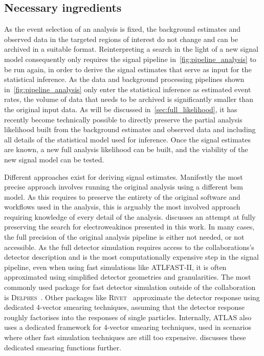 \subsection{Necessary ingredients}

As the event selection of an analysis is fixed, the background estimates and observed data in the targeted regions of interest do not change and can be archived in a suitable format. Reinterpreting a search in the light of a new signal model consequently only requires the signal pipeline in~\cref{fig:pipeline_analysis} to be run again, in order to derive the signal estimates that serve as input for the statistical inference. As the data and background processing pipelines shown in~\cref{fig:pipeline_analysis} only enter the statistical inference as estimated event rates, the volume of data that needs to be archived is significantly smaller than the original input data. As will be discussed in~\cref{sec:full_likelihood}, it has recently become technically possible to directly preserve the partial analysis likelihood built from the background estimates and observed data and including all details of the statistical model used for inference. Once the signal estimates are known, a new full analysis likelihood can be built, and the viability of the new signal model can be tested. 

Different approaches exist for deriving signal estimates. Manifestly the most precise approach involves running the original analysis using a different \gls{bsm} model. As this requires to preserve the entirety of the original software and workflows used in the analysis, this is arguably the most involved approach requiring knowledge of every detail of the analysis.  discusses an attempt at fully preserving the search for electroweakinos presented in this work. In many cases, the full precision of the original analysis pipeline is either not needed, or not accessible. 
As the full detector simulation requires access to the collaborations's detector description and is the most computationally expensive step in the signal pipeline, even when using fast simulations like \textsc{ATLFAST-II}, it is often approximated using simplified detector geometries and granularities. The most commonly used package for fast detector simulation outside of the collaboration is \textsc{Delphes}~\cite{Delphes:2009tx}. Other packages like \eg \textsc{Rivet}~\cite{Rivet1:2010ar,Rivet2:2019stt} approximate the detector response using dedicated 4-vector smearing techniques, assuming that the detector response roughly factorises into the responses of single particles. Internally, ATLAS also uses a dedicated framework for 4-vector smearing techniques, used in scenarios where other fast simulation techniques are still too expensive.  discusses these dedicated smearing functions further.

